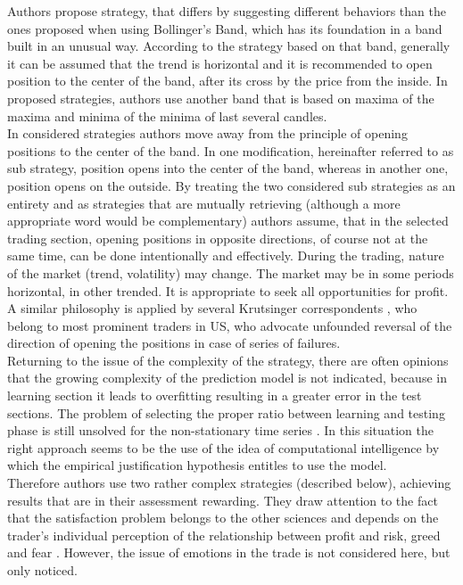 \documentclass{tewiart}
\begin{document}
Authors propose strategy, that differs by suggesting different behaviors than the ones proposed when using Bollinger's Band, which has its foundation in a band built in an unusual way. According to the strategy based on that band, generally it can be assumed that the trend is horizontal and it is recommended to open position to the center of the band, after its cross by the price from the inside. In proposed strategies, authors use another band that is based on maxima of the maxima and minima of the minima of last several candles.\\

In considered strategies authors move away from the principle of opening positions to the center of the band. In one modification, hereinafter referred to as sub strategy, position opens into the center of the band, whereas in another one, position opens on the outside. By treating the two considered sub strategies as an entirety and as strategies that are mutually retrieving (although a more appropriate word would be complementary) authors assume, that in the selected trading section, opening positions in opposite directions, of course not at the same time, can be done intentionally and effectively. During the trading, nature of the market (trend, volatility) may change. The market may be in some periods horizontal, in other trended. It is appropriate to seek all opportunities for profit. A similar philosophy is applied by several Krutsinger correspondents \cite{Krutsinger}, who belong to most prominent traders in US, who advocate unfounded reversal of the direction of opening the positions in case of series of failures.\\

Returning to the issue of the complexity of the strategy, there are often opinions that the growing complexity of the prediction model is not indicated, because in learning section it  leads to overfitting \cite{Murphy, Cai, Fujimoto}  resulting in a greater error in the test sections. The problem of selecting the proper ratio between learning and testing phase is still unsolved for the non-stationary time series \cite{Ball, Ivakhnenko}. In this situation the right approach seems to be the use of the idea of computational intelligence \cite{Polya, Pedrycz} by which the empirical justification hypothesis entitles to use the model.\\

Therefore authors use two rather complex strategies (described below), achieving results that are in their assessment rewarding. They draw attention to the fact that the satisfaction problem belongs to the other sciences and depends on the trader's individual perception of the relationship between profit and risk, greed and fear \cite{Kahneman}. However, the issue of emotions in the trade is not considered here, but only noticed.\\
\end{document}
